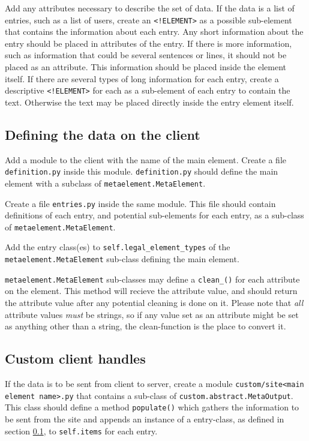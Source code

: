 Add any attributes necessary to describe the set of data. If the data is a list
of entries, such as a list of users, create an \texttt{<!ELEMENT>} as a
possible sub-element that contains the information about each entry. Any short
information about the entry should be placed in attributes of the entry. If
there is more information, such as information that could be several sentences
or lines, it should not be placed as an attribute. This information should be
placed inside the element itself. If there are several types of long
information for each entry, create a descriptive \texttt{<!ELEMENT>} for each
as a sub-element of each entry to contain the text. Otherwise the text may be
placed directly inside the entry element itself. 

\subsection{Defining the data on the client}
\label{sec:defclientmodel}
Add a module to the client with the name of the main element. Create a file
\texttt{definition.py} inside this module. \texttt{definition.py} should define
the main element with a subclass of \texttt{metaelement.MetaElement}.

Create a file \texttt{entries.py} inside the same module. This file should
contain definitions of each entry, and potential sub-elements for each entry,
as a sub-class of \texttt{metaelement.MetaElement}. 

Add the entry class(es) to \texttt{self.legal\_element\_types} of the \\ 
\texttt{metaelement.MetaElement} sub-class defining the main element. 

\texttt{metaelement.MetaElement} sub-classes may define a
\texttt{clean\_<attribute name>()} for each attribute on the element. This method
will recieve the attribute value, and should return the attribute value after
any potential cleaning is done on it. Please note that \textit{all} attribute
values \textit{must} be strings, so if any value set as an attribute might be
set as anything other than a string, the clean-function is the place to convert
it.

\subsection{Custom client handles}
If the data is to be sent from client to server, create a module
\texttt{custom/site<main element name>.py} that contains a sub-class of
\texttt{custom.abstract.MetaOutput}. This class should define a method
\texttt{populate()} which gathers the information to be sent from the site and
appends an instance of a entry-class, as defined in section
\ref{sec:defclientmodel}, to \texttt{self.items} for each entry.

